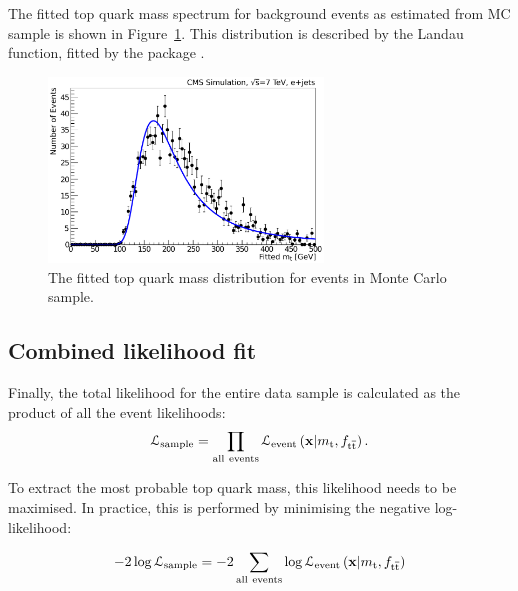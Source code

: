 The fitted top quark mass spectrum for background events as estimated from \WpJets MC sample is shown in
Figure~\ref{fig:background_wjets_fitted_top_mass}. This distribution is described by the Landau function, fitted by the 
\ROOT package \autocite{Landau}.

\begin{figure}[!htpb]
\begin{center}
	\includegraphics[width=0.65\textwidth]{background_wjets_fitted_top_mass}
	\caption{\label{fig:background_wjets_fitted_top_mass}
	The fitted top quark mass distribution for \ttbar events in \WpJets Monte Carlo sample.}
\end{center}
\end{figure}

\subsection{Combined likelihood fit}
\label{ss_top_mass:likelihood_fit}
Finally, the total likelihood for the entire data sample is calculated as the product of all the event likelihoods:
\begin{equation}
\mathcal{L}_{\rm sample} = \prod_{\rm all~events}
\mathcal{L}_\textrm{event} \left(\mathbf{x}|m_\mathrm{t}, f_{\mathrm{t}\overline{\mathrm{t}}} \right).
\label{eq:CombinedLikelihood}
\end{equation}

To extract the most probable top quark mass, this likelihood needs to be maximised. In practice, this is performed by
minimising the negative log-likelihood:

\begin{equation}
 -2\log{\mathcal{L}_{\rm sample}} = -2 \sum_{\rm all~events} \log{\mathcal{L}_\textrm{event} \left(\mathbf{x}|\ensuremath{m_\mathrm{t}},
 f_{\ensuremath{\mathrm{t}\overline{\mathrm{t}}}} \right)}
\label{eq:CombinedLogLikelihood}
\end{equation}

